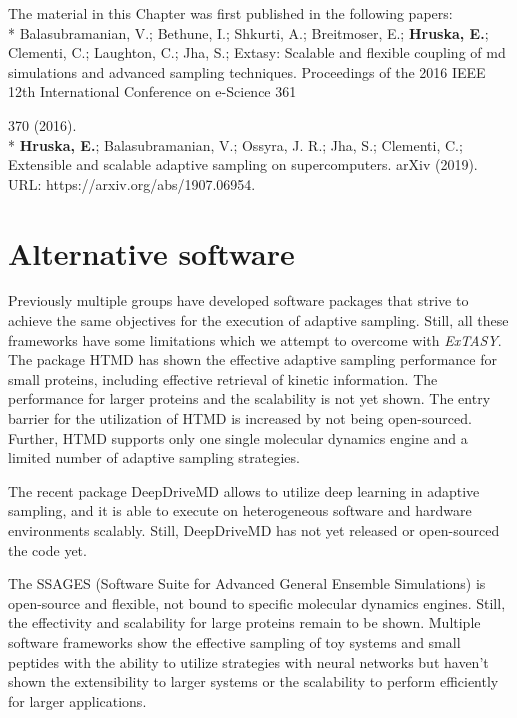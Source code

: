 The material in this Chapter was first published in the following papers: 
\\*
\cite{Extasy2016} Balasubramanian, V.; Bethune, I.; Shkurti, A.; Breitmoser, E.; \textbf{Hruska, E.}; Clementi, C.; Laughton, C.; Jha, S.; Extasy: Scalable and flexible coupling of md simulations
and advanced sampling techniques. Proceedings of the 2016 IEEE 12th
International Conference on e-Science 361{370 (2016).
\\*
\cite{Extasy2019} \textbf{Hruska, E.}; Balasubramanian, V.; Ossyra, J. R.; Jha, S.; Clementi, C.; Extensible
and scalable adaptive sampling on supercomputers. arXiv (2019). URL: https://arxiv.org/abs/1907.06954.


\section{\label{sec:alternative4}Alternative software}

Previously multiple groups have developed software packages that strive to achieve the same objectives for the execution of adaptive sampling. Still, all these frameworks have some limitations which we attempt to overcome with \emph{ExTASY}.
The package HTMD\cite{doerr2016htmd} has shown the effective adaptive sampling performance for small proteins, including effective retrieval of kinetic information. The performance for larger proteins and the scalability is not yet shown. The entry barrier for the utilization of HTMD is increased by not being open-sourced. Further, HTMD supports only one single molecular dynamics engine and a limited number of adaptive sampling strategies.

The recent package DeepDriveMD \cite{leeDeepDriveMDDeepLearningDriven2019} allows to utilize deep learning in adaptive sampling, and it is able to execute on heterogeneous software and hardware environments scalably. Still, DeepDriveMD has not yet released or open-sourced the code yet. 

The SSAGES (Software Suite for Advanced General Ensemble Simulations) \cite{SSAGES} is open-source and flexible, not bound to specific molecular dynamics engines. Still, the effectivity and scalability for large proteins remain to be shown. Multiple software frameworks \cite{jung2019acp, ribeiro2018tjocp, bonati2019pnasu} show the effective sampling of toy systems and small peptides with the ability to utilize strategies with neural networks but haven't shown the extensibility to larger systems or the scalability to perform efficiently for larger applications. 



}
